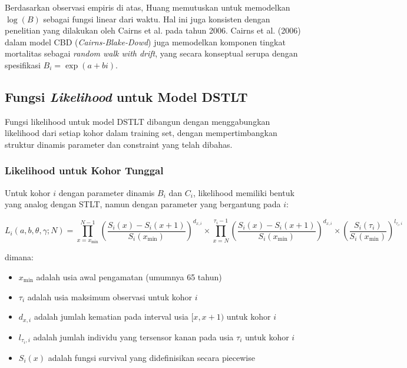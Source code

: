 Berdasarkan observasi empiris di atas, Huang memutuskan untuk memodelkan $\log(B)$ sebagai fungsi linear dari waktu. Hal ini juga konsisten dengan penelitian yang dilakukan oleh Cairns et al. pada tahun 2006. Cairns et al. (2006) dalam model CBD (\textit{Cairns-Blake-Dowd}) juga memodelkan komponen tingkat mortalitas sebagai \textit{random walk with drift}, yang secara konseptual serupa dengan spesifikasi $B_i = \exp(a + bi)$.

\subsection{Fungsi \textit{Likelihood} untuk Model DSTLT}

Fungsi likelihood untuk model DSTLT dibangun dengan menggabungkan likelihood dari setiap kohor dalam training set, dengan mempertimbangkan struktur dinamis parameter dan constraint yang telah dibahas.

\subsubsection{Likelihood untuk Kohor Tunggal}

Untuk kohor $i$ dengan parameter dinamis $B_i$ dan $C_i$, likelihood memiliki bentuk yang analog dengan STLT, namun dengan parameter yang bergantung pada $i$:

\begin{equation}
L_i(a, b, \theta, \gamma; N) = \prod_{x=x_{\min}}^{N-1} \left(\frac{S_i(x) - S_i(x+1)}{S_i(x_{\min})}\right)^{d_{x,i}} \times \prod_{x=N}^{\tau_i-1} \left(\frac{S_i(x) - S_i(x+1)}{S_i(x_{\min})}\right)^{d_{x,i}} \times \left(\frac{S_i(\tau_i)}{S_i(x_{\min})}\right)^{l_{\tau_i,i}}
\label{eq:dstlt_likelihood_single}
\end{equation}

dimana:
\begin{itemize}
\item $x_{\min}$ adalah usia awal pengamatan (umumnya 65 tahun)
\item $\tau_i$ adalah usia maksimum observasi untuk kohor $i$
\item $d_{x,i}$ adalah jumlah kematian pada interval usia $[x, x+1)$ untuk kohor $i$
\item $l_{\tau_i,i}$ adalah jumlah individu yang tersensor kanan pada usia $\tau_i$ untuk kohor $i$
\item $S_i(x)$ adalah fungsi survival yang didefinisikan secara piecewise
\end{itemize}

